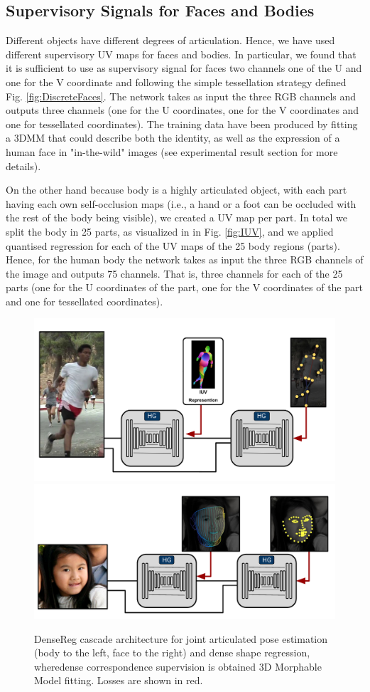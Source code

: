 \subsection{Supervisory Signals for Faces and Bodies}
\label{sec: supervisory_signal}

Different objects have different degrees of articulation. Hence, we have used different supervisory UV maps for faces and bodies. In particular, we found that it is sufficient to use as supervisory signal for faces two channels one of the U and one for the V coordinate and following the simple tessellation strategy defined Fig. \ref{fig:DiscreteFaces}. The network takes as input the three RGB channels and outputs three channels (one for the U coordinates, one for the V coordinates and one for tessellated coordinates). The training data have been produced by fitting a 3DMM that could describe both the identity, as well as the expression of a human face in "in-the-wild" images (see experimental result section for more details). 

On the other hand because body is a highly articulated object, with each part having each own self-occlusion maps (i.e., a hand or a foot can be occluded with the rest of the body being visible), we created a UV map per part. In total we split the body in 25 parts, as visualized in in Fig. \ref{fig:IUV}, and we applied quantised regression for each of the UV maps of the 25 body regions (parts). Hence, for the human body the network takes as input the three RGB channels of the image and outputs 75 channels. That is, three channels for each of the 25 parts (one for the U coordinates of the part, one for the V coordinates of the part and one for tessellated coordinates). 

\begin{figure}[h!]
\begin{center}
    \includegraphics[width=0.49 \linewidth ]{resources/Human_Poses/PoseReg_Frontpage4-2}
    \includegraphics[width=0.49 \linewidth ]{resources/Human_Poses/PoseReg_Frontpage5-2}
\end{center}
    \caption{DenseReg cascade architecture for joint articulated pose estimation (body to the left, face to the right) and dense shape regression, wheredense correspondence supervision is obtained 3D Morphable Model fitting. Losses are shown in red. }
\label{fig:cascadeBody}
\end{figure}

